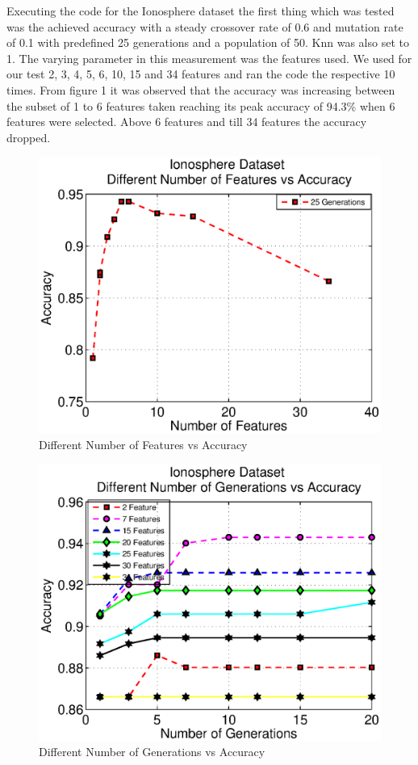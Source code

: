 \documentclass[11pt,onecolumn,a4paper]{article}
\begin{document}
Executing the code for the Ionosphere dataset the first thing which was tested was the achieved accuracy with a steady crossover rate of 0.6 and mutation rate of 0.1 with predefined 25 generations and a population of 50. Knn was also set to 1. The varying parameter in this measurement was the features used. We used for our test 2, 3, 4, 5, 6, 10, 15 and 34 features and ran the code the respective 10 times. From figure 1 it was observed that the accuracy was increasing between the subset of 1 to 6 features taken reaching its peak accuracy of 94.3\% when 6 features were selected. Above 6 features and till 34 features the accuracy dropped.    
    \begin{figure}[h!]
      \centering
      \includegraphics[width=0.6\linewidth]{img/ionfeat2.eps}
     \caption{Different Number of Features vs Accuracy}
    \end{figure}
    \begin{figure}[h!]
      \centering
      \includegraphics[width=0.6\linewidth]{img/ionfeat.eps}
      \caption{Different Number of Generations vs Accuracy}
    \end{figure}
\end{document}

